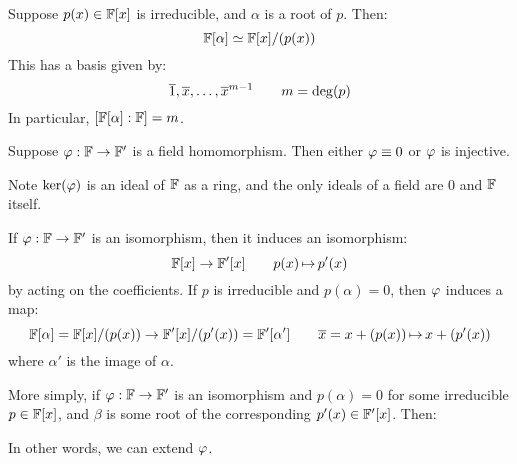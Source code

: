 Suppose $ p(x) \in \mathbb{F}[x] $ is irreducible, and $ \alpha $ is a root of $ p $.
Then:
\begin{equation*}
    \mathbb{F}[\alpha] \simeq \mathbb{F}[x]/(p(x))
\end{equation*}
This has a basis given by:
\begin{equation*}
    \overline{1}, \overline{x}, \dots, \overline{x}^{m-1} \qquad m = \deg(p)
\end{equation*}
In particular, $ [\mathbb{F}[\alpha] : \mathbb{F}] = m $.

\begin{lm}
    Suppose $ \operatorname{\varphi} : \mathbb{F} \rightarrow \mathbb{F}' $ is a field homomorphism.
    Then either $ \operatorname{\varphi} \equiv 0 $ or $ \operatorname{\varphi} $ is injective.
\end{lm}

\begin{pf}[source=Primary Source Material]
    Note $ \ker(\operatorname{\varphi}) $ is an ideal of $ \mathbb{F} $ as a ring, and the only
    ideals of a field are 0 and $ \mathbb{F} $ itself.
\end{pf}

\begin{thm}
    If $ \operatorname{\varphi}: \mathbb{F} \rightarrow \mathbb{F}' $ is an isomorphism,
    then it induces an isomorphism:
    \begin{equation*}
        \mathbb{F}[x] \rightarrow \mathbb{F}'[x] \qquad
        p(x) \operatorname{\mapsto} p'(x)
    \end{equation*}
    by acting on the coefficients. \vsp
    If $ p $ is irreducible and $ p(\alpha) = 0 $, then $ \operatorname{\varphi} $ induces a map:
    \begin{equation*}
        \mathbb{F}[\alpha] = \mathbb{F}[x]/(p(x)) \rightarrow
        \mathbb{F}'[x]/(p'(x)) = \mathbb{F}'[\alpha'] \qquad
        \overline{x} = x + (p(x)) \operatorname{\mapsto} x + (p'(x))
    \end{equation*}
    where $ \alpha' $ is the image of $ \alpha $.
\end{thm}
More simply, if $ \operatorname{\varphi}: \mathbb{F} \rightarrow \mathbb{F}' $ is an isomorphism and
$ p(\alpha) = 0 $ for some irreducible $ p \in \mathbb{F}[x] $,
and $ \beta $ is some root of the corresponding $ p'(x) \in \mathbb{F}'[x] $.
Then:

\centering
{}
\flushleft

In other words, we can extend $ \operatorname{\varphi} $.

